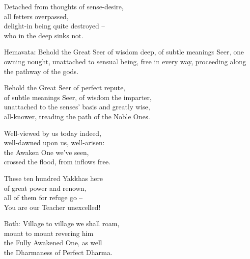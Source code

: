 \begin{MyDescription}{}
Detached from thoughts of sense-desire,\\
all fetters overpassed,\\
delight-in being quite destroyed – \\
who in the deep sinks not.
\end{MyDescription}      


\begin{MyDescription}{Hemavata:}
Behold the Great Seer of wisdom deep,
of subtle meanings Seer, one owning nought,
unattached to sensual being, free in every way,
proceeding along the pathway of the gods.
\end{MyDescription}    

\begin{MyDescription}{}
Behold the Great Seer of perfect repute,\\
of subtle meanings Seer, of wisdom the imparter,\\
unattached to the senses' basis and greatly wise,\\
all-knower, treading the path of the Noble Ones.
\end{MyDescription}   

\begin{MyDescription}{}
Well-viewed by us today indeed,\\
well-dawned upon us, well-arisen:\\
the Awaken One we've seen,\\
crossed the flood, from inflows free.
\end{MyDescription}   

\begin{MyDescription}{}
These ten hundred Yakkhas here\\
of great power and renown,\\
all of them for refuge go – \\
You are our Teacher unexcelled!
\end{MyDescription} 

\begin{MyDescription}{Both:}
Village to village we shall roam,\\
mount to mount revering him\\
the Fully Awakened One, as well\\
the Dharmaness of Perfect Dharma.
\end{MyDescription}       

